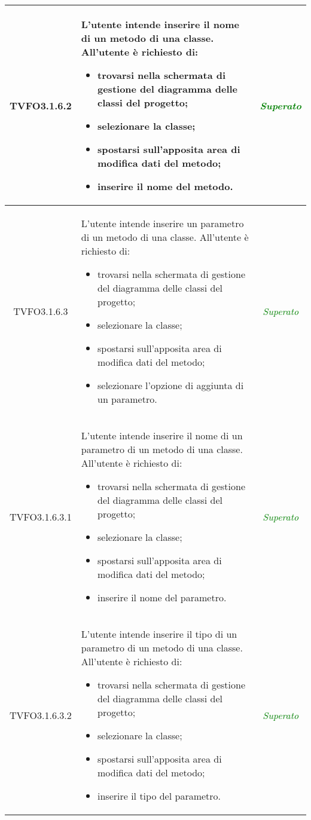 \begin{longtable}{|c|>{}m{8cm}|c|}
\hypertarget{TVFO3.1.6.2}{TVFO3.1.6.2} & L'utente intende inserire il nome di un metodo di una classe.
All'utente è richiesto di:
\begin{itemize}
	\item trovarsi nella schermata di gestione del diagramma delle classi del progetto;
	\item selezionare la classe;
	\item spostarsi sull'apposita area di modifica dati del metodo;
	\item inserire il nome del metodo.
\end{itemize} & \textcolor{Green}{\textit{Superato}}\\ \hline

\hypertarget{TVFO3.1.6.3}{TVFO3.1.6.3} & L'utente intende inserire un parametro di un metodo di una classe.
All'utente è richiesto di:
\begin{itemize}
	\item trovarsi nella schermata di gestione del diagramma delle classi del progetto;
	\item selezionare la classe;
	\item spostarsi sull'apposita area di modifica dati del metodo;
	\item selezionare l'opzione di aggiunta di un parametro.
\end{itemize} & \textcolor{Green}{\textit{Superato}}\\ \hline

\hypertarget{TVFO3.1.6.3.1}{TVFO3.1.6.3.1} & L'utente intende inserire il nome di un parametro di un metodo di una classe.
All'utente è richiesto di:
\begin{itemize}
	\item trovarsi nella schermata di gestione del diagramma delle classi del progetto;
	\item selezionare la classe;
	\item spostarsi sull'apposita area di modifica dati del metodo;
	\item inserire il nome del parametro.
\end{itemize} & \textcolor{Green}{\textit{Superato}}\\ \hline

\hypertarget{TVFO3.1.6.3.2}{TVFO3.1.6.3.2} & L'utente intende inserire il tipo di un parametro di un metodo di una classe.
All'utente è richiesto di:
\begin{itemize}
	\item trovarsi nella schermata di gestione del diagramma delle classi del progetto;
	\item selezionare la classe;
	\item spostarsi sull'apposita area di modifica dati del metodo;
	\item inserire il tipo del parametro.
\end{itemize} & \textcolor{Green}{\textit{Superato}}\\ \hline


\end{longtable}
